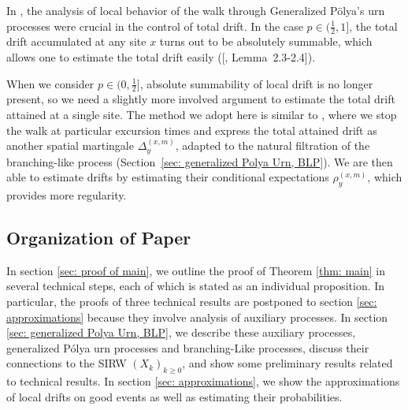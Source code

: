\documentclass[twoside,12pt,a4paper]{article}
\numberwithin{equation}{section}
\newcommand\TBD{\textcolor{red}{TBD.}}
\begin{document}
	In \cite{KMP22}, the analysis of local behavior of the walk through Generalized P\"olya's urn processes were crucial in the control of total drift. 
	In the case $p \in (\frac{1}{2}, 1]$, the total drift accumulated at any site $x$ turns out to be absolutely summable, which allows one to estimate the total drift easily ([\cite{KMP22}, Lemma~2.3-2.4]).

	When we consider $p \in (0,\frac{1}{2}]$, absolute summability of local drift is no longer present, so we need a slightly more involved argument to estimate the total drift attained at a single site. The method we adopt here is similar to \cite{KP16}, where we stop the walk at particular excursion times and express the total attained drift as another spatial martingale $\Delta_y^{(x,m)}$, adapted to the natural filtration of the branching-like process (Section~\ref{sec: generalized Polya Urn, BLP}). We are then able to estimate drifts by estimating their conditional expectations $\rho_y^{(x,m)}$, which provides more regularity.

	
	\subsection{Organization of Paper}
	In section \ref{sec: proof of main}, we outline the proof of Theorem \ref{thm: main} in several technical steps, each of which is stated as an individual proposition. In particular, the proofs of three technical results are postponed to section \ref{sec: approximations} because they involve analysis of auxiliary processes. In section \ref{sec: generalized Polya Urn, BLP}, we describe these auxiliary processes, generalized P\'{o}lya urn processes and branching-Like processes, discuss their connections to the SIRW $(X_k)_{k\geq 0}$, and show some preliminary results related to technical results. In section \ref{sec: approximations}, we show the approximations of local drifts on good events as well as estimating their probabilities. 
	
\end{document}
